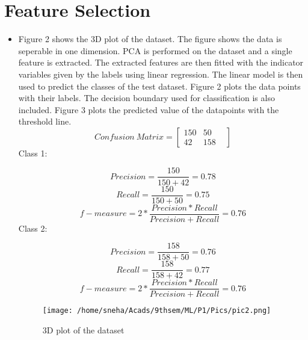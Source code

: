 \documentclass[12pt]{article}
\begin{document}
\section{Feature Selection}
\begin{itemize}
\item{Figure 2 shows the 3D plot of the dataset. The figure shows the data is seperable in one dimension. PCA is performed on the dataset and a single feature is extracted. The extracted features are then fitted with the indicator variables given by the labels using linear regression. The linear model is then used to predict the classes of the test dataset. Figure 2 plots the data points with their labels. The decision boundary used for classification is also included. Figure 3 plots the predicted value of the datapoints with the threshold line. \\


\begin{equation}
Confusion\ Matrix = \begin{bmatrix} 150 & 50 &\\ 42 &158 \end{bmatrix}
\end{equation}
Class 1:

\begin{equation}
Precision = \frac{150}{150+42} = 0.78
\end{equation}
\begin{equation}
Recall = \frac{150}{150+50} = 0.75
\end{equation}
\begin{equation}
f-measure = 2*\frac{Precision*Recall}{Precision + Recall} = 0.76
\end{equation}
Class 2:

\begin{equation}
Precision = \frac{158}{158+50} = 0.76
\end{equation}
\begin{equation}
Recall = \frac{158}{158+42} = 0.77
\end{equation}
\begin{equation}
f-measure = 2*\frac{Precision*Recall}{Precision + Recall} = 0.76
\end{equation}


\begin{figure}


	\centering
		\texttt{[image: /home/sneha/Acads/9thsem/ML/P1/Pics/pic2.png]}
	\caption{3D plot of the dataset}
	
\end{figure}


}
\end{itemize}
\end{document}
